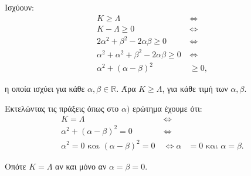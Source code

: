
\begin{alist}
\item Ισχύουν:
\begin{align*}
K \ge \Lambda \ &\Leftrightarrow \\
K - \Lambda \ge 0 \ &\Leftrightarrow \\
2\alpha^2 + \beta^2 - 2\alpha\beta \ge 0 \ &\Leftrightarrow \\
\alpha^2 + \alpha^2 + \beta^2 - 2\alpha\beta \ge 0 \ &\Leftrightarrow \\
\alpha^2 + (\alpha - \beta)^2 &\ge 0,
\end{align*}

η οποία ισχύει για κάθε $\alpha, \beta \in \mathbb{R}$. Άρα $K \ge \Lambda$, για κάθε τιμή των $\alpha, \beta$.

\item Εκτελώντας τις πράξεις όπως στο $\alpha)$ ερώτημα έχουμε ότι:
\begin{align*}
K = \Lambda \ &\Leftrightarrow \\
\alpha^2 + (\alpha - \beta)^2 = 0 \ &\Leftrightarrow \\
\alpha^2 = 0 \text{ και } (\alpha - \beta)^2 = 0 \ &\Leftrightarrow \alpha &= 0 \text{ και } \alpha = \beta.
\end{align*}

Οπότε $K = \Lambda$ αν και μόνο αν $\alpha = \beta = 0$.
\end{alist}

